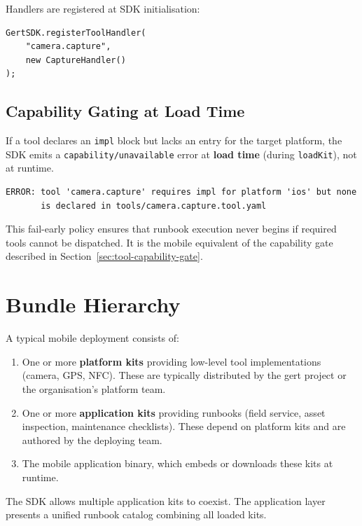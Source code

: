 Handlers are registered at SDK initialisation:

\begin{verbatim}
GertSDK.registerToolHandler(
    "camera.capture", 
    new CaptureHandler()
);
\end{verbatim}

\subsection{Capability Gating at Load Time}

If a tool declares an \texttt{impl} block but lacks an entry for the target platform, the SDK emits a \texttt{capability/unavailable} error at \textbf{load time} (during \texttt{loadKit}), not at runtime.

\begin{verbatim}
ERROR: tool 'camera.capture' requires impl for platform 'ios' but none 
       is declared in tools/camera.capture.tool.yaml
\end{verbatim}

This fail-early policy ensures that runbook execution never begins if required tools cannot be dispatched. It is the mobile equivalent of the capability gate described in Section~\ref{sec:tool-capability-gate}.

\section{Bundle Hierarchy}

A typical mobile deployment consists of:

\begin{enumerate}
  \item One or more \textbf{platform kits} providing low-level tool implementations (camera, GPS, NFC). These are typically distributed by the gert project or the organisation's platform team.
  \item One or more \textbf{application kits} providing runbooks (field service, asset inspection, maintenance checklists). These depend on platform kits and are authored by the deploying team.
  \item The mobile application binary, which embeds or downloads these kits at runtime.
\end{enumerate}

The SDK allows multiple application kits to coexist. The application layer presents a unified runbook catalog combining all loaded kits.

